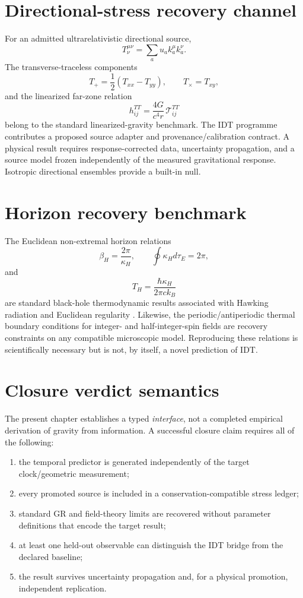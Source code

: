 \section{Directional-stress recovery channel}

For an admitted ultrarelativistic directional source,
\[
T_\nu^{\mu\nu}
=
\sum_a u_a k_a^\mu k_a^\nu.
\]
The transverse-traceless components
\[
T_+=\frac12(T_{xx}-T_{yy}),
\qquad
T_\times=T_{xy},
\]
and the linearized far-zone relation
\[
\boxed{
h_{ij}^{TT}
=
\frac{4G}{c^4r}\,\mathcal T_{ij}^{TT}
}
\]
belong to the standard linearized-gravity benchmark. The IDT programme contributes a proposed source adapter and provenance/calibration contract. A physical result requires response-corrected data, uncertainty propagation, and a source model frozen independently of the measured gravitational response. Isotropic directional ensembles provide a built-in null.

\section{Horizon recovery benchmark}

The Euclidean non-extremal horizon relations
\[
\beta_H=\frac{2\pi}{\kappa_H},
\qquad
\oint\kappa_Hd\tau_E=2\pi,
\]
and
\[
\boxed{
T_H=\frac{\hbar\kappa_H}{2\pi c k_B}
}
\]
are standard black-hole thermodynamic results associated with Hawking radiation and Euclidean regularity \cite{Hawking1975,GibbonsHawking1977}. Likewise, the periodic/antiperiodic thermal boundary conditions for integer- and half-integer-spin fields are recovery constraints on any compatible microscopic model. Reproducing these relations is scientifically necessary but is not, by itself, a novel prediction of IDT.

\section{Closure verdict semantics}

The present chapter establishes a typed \emph{interface}, not a completed empirical derivation of gravity from information. A successful closure claim requires all of the following:
\begin{enumerate}
\item the temporal predictor is generated independently of the target clock/geometric measurement;
\item every promoted source is included in a conservation-compatible stress ledger;
\item standard GR and field-theory limits are recovered without parameter definitions that encode the target result;
\item at least one held-out observable can distinguish the IDT bridge from the declared baseline;
\item the result survives uncertainty propagation and, for a physical promotion, independent replication.
\end{enumerate}

